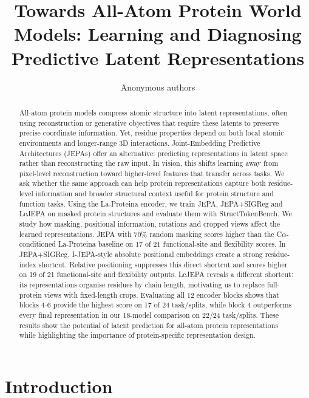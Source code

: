 \documentclass{article}
\title{Towards All-Atom Protein World Models: Learning and Diagnosing Predictive Latent Representations}
\author{Anonymous authors}
\begin{document}
\maketitle

\begin{abstract}
All-atom protein models compress atomic structure into latent representations, often using reconstruction or generative objectives that require these latents to preserve precise coordinate information. Yet, residue properties depend on both local atomic environments and longer-range 3D interactions. Joint-Embedding Predictive Architectures (JEPAs) offer an alternative: predicting representations in latent space rather than reconstructing the raw input. In vision, this shifts learning away from pixel-level reconstruction toward higher-level features that transfer across tasks. We ask whether the same approach can help protein representations capture both residue-level information and broader structural context useful for protein structure and function tasks. Using the La-Proteina encoder, we train JEPA, JEPA+SIGReg and LeJEPA on masked protein structures and evaluate them with StructTokenBench. We study how masking, positional information, rotations and cropped views affect the learned representations. JEPA with 70\% random masking scores higher than the C$\alpha$-conditioned La-Proteina baseline on 17 of 21 functional-site and flexibility scores. In JEPA+SIGReg, I-JEPA-style absolute positional embeddings create a strong residue-index shortcut. Relative positioning suppresses this direct shortcut and scores higher on 19 of 21 functional-site and flexibility outputs. LeJEPA reveals a different shortcut: its representations organise residues by chain length, motivating us to replace full-protein views with fixed-length crops. 
Evaluating all 12 encoder blocks shows that blocks 4-6 provide the highest score on 17 of 24 task/splits, while block 4 outperforms every final representation in our 18-model comparison on 22/24 task/splits.
These results show the potential of latent prediction for all-atom protein representations while highlighting the importance of protein-specific representation design.
\end{abstract}

\section{Introduction}
\label{sec:introduction}
\end{document}
